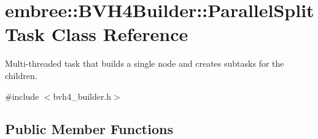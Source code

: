 \hypertarget{classembree_1_1_b_v_h4_builder_1_1_parallel_split_task}{
\section{embree::BVH4Builder::ParallelSplitTask Class Reference}
\label{classembree_1_1_b_v_h4_builder_1_1_parallel_split_task}
}


Multi-\/threaded task that builds a single node and creates subtasks for the children.  




{\ttfamily \#include $<$bvh4\_\-builder.h$>$}

\subsection*{Public Member Functions}
